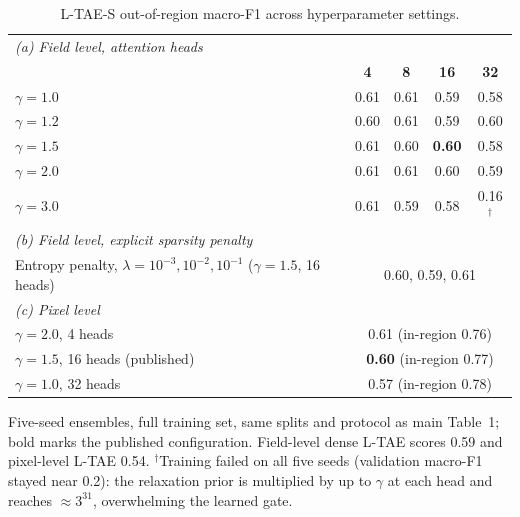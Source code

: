 \documentclass[preprint,authoryear,3p]{elsarticle}
\begin{document}
\begin{table}[!ht]
\centering
\caption{L-TAE-S out-of-region macro-F1 across hyperparameter settings.}
\label{stab:sens}
\renewcommand{\arraystretch}{1.1}
\setlength{\tabcolsep}{8pt}
\footnotesize
\begin{tabular}{lcccc}
\toprule
\multicolumn{5}{l}{\emph{(a) Field level, attention heads}} \\
 & \textbf{4} & \textbf{8} & \textbf{16} & \textbf{32} \\
\midrule
$\gamma=1.0$ & 0.61 & 0.61 & 0.59 & 0.58 \\
$\gamma=1.2$ & 0.60 & 0.61 & 0.59 & 0.60 \\
$\gamma=1.5$ & 0.61 & 0.60 & \textbf{0.60} & 0.58 \\
$\gamma=2.0$ & 0.61 & 0.61 & 0.60 & 0.59 \\
$\gamma=3.0$ & 0.61 & 0.59 & 0.58 & 0.16$^{\dagger}$ \\
\midrule
\multicolumn{5}{l}{\emph{(b) Field level, explicit sparsity penalty}} \\
Entropy penalty, $\lambda=10^{-3}, 10^{-2}, 10^{-1}$ ($\gamma=1.5$, 16 heads) & \multicolumn{4}{c}{0.60, 0.59, 0.61} \\
\midrule
\multicolumn{5}{l}{\emph{(c) Pixel level}} \\
$\gamma=2.0$, 4 heads & \multicolumn{4}{c}{0.61 (in-region 0.76)} \\
$\gamma=1.5$, 16 heads (published) & \multicolumn{4}{c}{\textbf{0.60} (in-region 0.77)} \\
$\gamma=1.0$, 32 heads & \multicolumn{4}{c}{0.57 (in-region 0.78)} \\
\bottomrule
\end{tabular}
\par\vspace{3pt}
\begin{minipage}{\linewidth}
\footnotesize
Five-seed ensembles, full training set, same splits and protocol as main Table~1; bold marks the published configuration. Field-level dense L-TAE scores 0.59 and pixel-level L-TAE 0.54. $^{\dagger}$Training failed on all five seeds (validation macro-F1 stayed near 0.2): the relaxation prior is multiplied by up to $\gamma$ at each head and reaches ${\approx}3^{31}$, overwhelming the learned gate.
\end{minipage}
\end{table}

\clearpage
\end{document}
